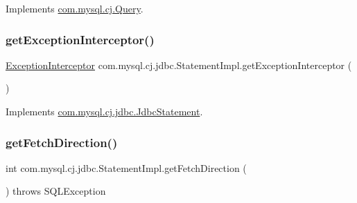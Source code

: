 Implements \mbox{\hyperlink{interfacecom_1_1mysql_1_1cj_1_1_query_a3e23446737570171c4323243ce3f9239}{com.\+mysql.\+cj.\+Query}}.

\mbox{\label{classcom_1_1mysql_1_1cj_1_1jdbc_1_1_statement_impl_a8c7aeabcfab5a1dcac5bf2fec0accaab}} 
\subsubsection{\texorpdfstring{get\+Exception\+Interceptor()}{getExceptionInterceptor()}}
{\footnotesize\ttfamily \mbox{\hyperlink{interfacecom_1_1mysql_1_1cj_1_1exceptions_1_1_exception_interceptor}{Exception\+Interceptor}} com.\+mysql.\+cj.\+jdbc.\+Statement\+Impl.\+get\+Exception\+Interceptor (\begin{DoxyParamCaption}{ }\end{DoxyParamCaption})}



Implements \mbox{\hyperlink{interfacecom_1_1mysql_1_1cj_1_1jdbc_1_1_jdbc_statement_acaa2fa9b43fdb8d5020efed654034d53}{com.\+mysql.\+cj.\+jdbc.\+Jdbc\+Statement}}.

\mbox{\label{classcom_1_1mysql_1_1cj_1_1jdbc_1_1_statement_impl_ab0ef6daffffd7fd9dc6405c78b697b7d}} 
\subsubsection{\texorpdfstring{get\+Fetch\+Direction()}{getFetchDirection()}}
{\footnotesize\ttfamily int com.\+mysql.\+cj.\+jdbc.\+Statement\+Impl.\+get\+Fetch\+Direction (\begin{DoxyParamCaption}{ }\end{DoxyParamCaption}) throws S\+Q\+L\+Exception}

